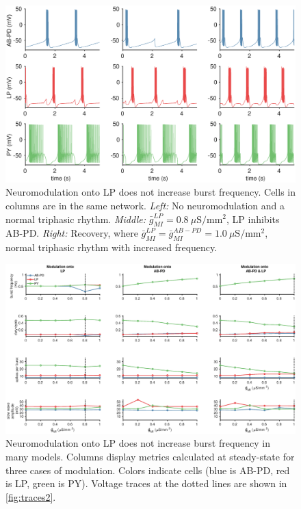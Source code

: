 \FloatBarrier

\begin{figure}[t]
	\centering
	\includegraphics[width=1.0\linewidth]{gfx/all-modulation/traces2}
	\caption[Modulation onto LP does not increase frequency (traces)]{Neuromodulation onto \acs{LP} does not increase burst frequency. Cells in columns are in the same network. \textit{Left:} No neuromodulation and a normal triphasic rhythm. \textit{Middle:} $\bar{g}_{MI}^{LP} = 0.8~\mu \mathrm{S/mm^2}$, \acs{LP} inhibits \acs{AB}-\acs{PD}. \textit{Right:} Recovery, where $\bar{g}_{MI}^{LP} = \bar{g}_{MI}^{AB-PD} = 1.0~\mu \mathrm{S/mm^2}$, normal triphasic rhythm with increased frequency.}
	\label{fig:traces2}
\end{figure}

\begin{figure}[b]
	\centering
	\includegraphics[width=1.0\linewidth]{gfx/all-modulation/metrics2}
	\caption[Modulation onto LP does not increase frequency (metrics)]{Neuromodulation onto \acs{LP} does not increase burst frequency in many models. Columns display metrics calculated at steady-state for three cases of modulation. Colors indicate cells (blue is \acs{AB}-\acs{PD}, red is \acs{LP}, green is \acs{PY}). Voltage traces at the dotted lines are shown in \autoref{fig:traces2}.}
	\label{fig:metrics2}
\end{figure}


